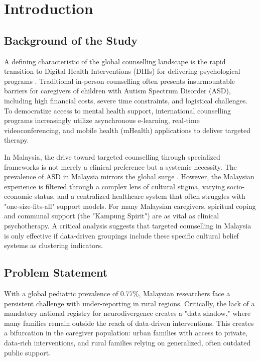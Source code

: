 \chapter{Introduction}

\section{Background of the Study}
A defining characteristic of the global counselling landscape is the rapid transition to Digital Health Interventions (DHIs) for delivering psychological programs \citep{Wind2020_98, Naslund2017_76, Sutherland2018_77}. Traditional in-person counselling often presents insurmountable barriers for caregivers of children with Autism Spectrum Disorder (ASD), including high financial costs, severe time constraints, and logistical challenges. To democratize access to mental health support, international counselling programs increasingly utilize asynchronous e-learning, real-time videoconferencing, and mobile health (mHealth) applications to deliver targeted therapy. 

In Malaysia, the drive toward targeted counselling through specialized frameworks is not merely a clinical preference but a systemic necessity. The prevalence of ASD in Malaysia mirrors the global surge \citep{Santomauro2025_73}. However, the Malaysian experience is filtered through a complex lens of cultural stigma, varying socio-economic status, and a centralized healthcare system that often struggles with "one-size-fits-all" support models. For many Malaysian caregivers, spiritual coping and communal support (the "Kampung Spirit") are as vital as clinical psychotherapy. A critical analysis suggests that targeted counselling in Malaysia is only effective if data-driven groupings include these specific cultural belief systems as clustering indicators. 

\section{Problem Statement}
With a global pediatric prevalence of 0.77\%, Malaysian researchers face a persistent challenge with under-reporting in rural regions. Critically, the lack of a mandatory national registry for neurodivergence creates a "data shadow," where many families remain outside the reach of data-driven interventions. This creates a bifurcation in the caregiver population: urban families with access to private, data-rich interventions, and rural families relying on generalized, often outdated public support. 

